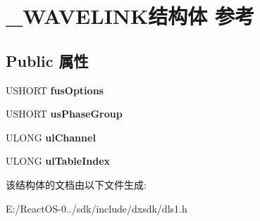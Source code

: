 \hypertarget{struct___w_a_v_e_l_i_n_k}{}\section{\+\_\+\+W\+A\+V\+E\+L\+I\+N\+K结构体 参考}
\label{struct___w_a_v_e_l_i_n_k}
\subsection*{Public 属性}
\begin{DoxyCompactItemize}
\item 
\mbox{\label{struct___w_a_v_e_l_i_n_k_a0f6cf6908c39ac0d0fc3c33f033553f8}} 
U\+S\+H\+O\+RT {\bfseries fus\+Options}
\item 
\mbox{\label{struct___w_a_v_e_l_i_n_k_a5f977e547ac958c37d4e2f79a51fe2aa}} 
U\+S\+H\+O\+RT {\bfseries us\+Phase\+Group}
\item 
\mbox{\label{struct___w_a_v_e_l_i_n_k_acfea6ca0033def3e354f3aab638b28de}} 
U\+L\+O\+NG {\bfseries ul\+Channel}
\item 
\mbox{\label{struct___w_a_v_e_l_i_n_k_a5426416fcbfc19eef54b2cea2d8bea16}} 
U\+L\+O\+NG {\bfseries ul\+Table\+Index}
\end{DoxyCompactItemize}


该结构体的文档由以下文件生成\+:\begin{DoxyCompactItemize}
\item 
E\+:/\+React\+O\+S-\/0../sdk/include/dxsdk/dls1.\+h\end{DoxyCompactItemize}
